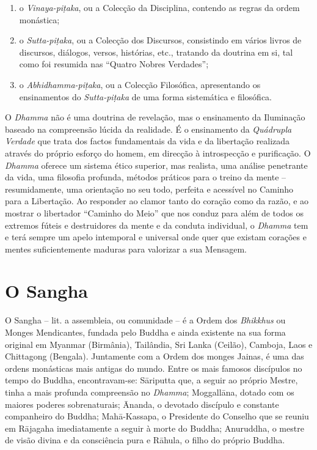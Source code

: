 \begin{enumerate}
  \item o \emph{Vinaya-piṭaka}, ou a Colecção da Disciplina, contendo as regras
        da ordem monástica;

  \item o \emph{Sutta-piṭaka}, ou a Colecção dos Discursos, consistindo em
        vários livros de discursos, diálogos, versos, histórias, etc., tratando
        da doutrina em si, tal como foi resumida nas ``Quatro Nobres Verdades'';

  \item o \emph{Abhidhamma-piṭaka}, ou a Colecção Filosófica, apresentando os
        ensinamentos do \emph{Sutta-piṭaka} de uma forma sistemática e
        filosófica.
\end{enumerate}

O \emph{Dhamma} não é uma doutrina de revelação, mas o ensinamento da Iluminação
baseado na compreensão lúcida da realidade. É o ensinamento da \emph{Quádrupla
  Verdade} que trata dos factos fundamentais da vida e da libertação realizada
através do próprio esforço do homem, em direcção à introspecção e purificação. O
\emph{Dhamma} oferece um sistema ético superior, mas realista, uma análise
penetrante da vida, uma filosofia profunda, métodos práticos para o treino da
mente -- resumidamente, uma orientação no seu todo, perfeita e acessível no
Caminho para a Libertação. Ao responder ao clamor tanto do coração como da
razão, e ao mostrar o libertador ``Caminho do Meio'' que nos conduz para além de
todos os extremos fúteis e destruidores da mente e da conduta individual, o
\emph{Dhamma} tem e terá sempre um apelo intemporal e universal onde quer que
existam corações e mentes suficientemente maduras para valorizar a sua Mensagem.

\section{O Sangha}

O Sangha -- lit. a assembleia, ou comunidade -- é a Ordem dos \emph{Bhikkhus} ou
Monges Mendicantes, fundada pelo Buddha e ainda existente na sua forma original
em Myanmar (Birmânia), Tailândia, Sri Lanka (Ceilão), Camboja, Laos e Chittagong
(Bengala). Juntamente com a Ordem dos monges Jainas, é uma das ordens monásticas
mais antigas do mundo. Entre os mais famosos discípulos no tempo do Buddha,
encontravam-se: Sāriputta que, a seguir ao próprio Mestre, tinha a mais profunda
compreensão no \emph{Dhamma}; Moggallāna, dotado com os maiores poderes
sobrenaturais; Ānanda, o devotado discípulo e constante companheiro do Buddha;
Mahā-Kassapa, o Presidente do Conselho que se reuniu em Rājagaha imediatamente a
seguir à morte do Buddha; Anuruddha, o mestre de visão divina e da consciência
pura e Rāhula, o filho do próprio Buddha.

